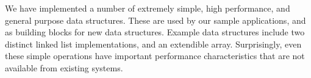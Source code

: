 \documentclass[letterpaper,english]{article}
\begin{document}
We have implemented a number of extremely simple, high performance,
and general purpose data structures.  These are used by our sample
applications, and as building blocks for new data structures.  Example
data structures include two distinct linked list implementations, and
an extendible array.  Surprisingly, even these simple operations have
important performance characteristics that are not available from
existing systems.



%
%
%
%
%
%
%
%
\end{document}
